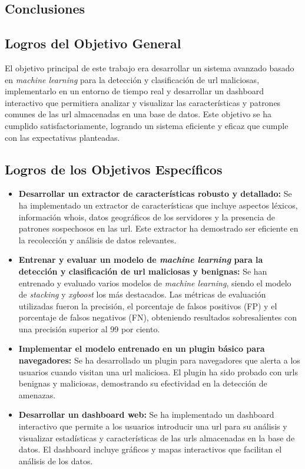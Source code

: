 \subsection{Conclusiones}


\subsection*{Logros del Objetivo General}
El objetivo principal de este trabajo era desarrollar un sistema avanzado basado en \textit{machine learning} para la detección y clasificación de \gls{url} maliciosas, implementarlo en un entorno de tiempo real y desarrollar un \gls{dashboard} interactivo que permitiera analizar y visualizar las características y patrones comunes de las \gls{url} almacenadas en una base de datos. Este objetivo se ha cumplido satisfactoriamente, logrando un sistema eficiente y eficaz que cumple con las expectativas planteadas.

\subsection{Logros de los Objetivos Específicos}
\begin{itemize}
    \item \textbf{Desarrollar un extractor de características robusto y detallado:} Se ha implementado un extractor de características que incluye aspectos léxicos, información \gls{whois}, datos geográficos de los servidores y la presencia de patrones sospechosos en las \gls{url}. Este extractor ha demostrado ser eficiente en la recolección y análisis de datos relevantes.
    
    \item \textbf{Entrenar y evaluar un modelo de \textit{machine learning} para la detección y clasificación de \gls{url} maliciosas y benignas:} Se han entrenado y evaluado varios modelos de \textit{machine learning}, siendo el modelo de \textit{stacking} y \textit{xgboost} los más destacados. Las métricas de evaluación utilizadas fueron la precisión, el porcentaje de falsos positivos (FP) y el porcentaje de falsos negativos (FN), obteniendo resultados sobresalientes con una precisión superior al 99 por ciento.
    
    \item \textbf{Implementar el modelo entrenado en un \gls{plugin} básico para navegadores:} Se ha desarrollado un \gls{plugin} para navegadores que alerta a los usuarios cuando visitan una \gls{url} maliciosa. El \gls{plugin} ha sido probado con \glspl{url} benignas y maliciosas, demostrando su efectividad en la detección de amenazas.
    
    \item \textbf{Desarrollar un \gls{dashboard} web:} Se ha implementado un \gls{dashboard} interactivo que permite a los usuarios introducir una \gls{url} para su análisis y visualizar estadísticas y características de las \glspl{url} almacenadas en la base de datos. El \gls{dashboard} incluye gráficos y mapas interactivos que facilitan el análisis de los datos.
\end{itemize}

